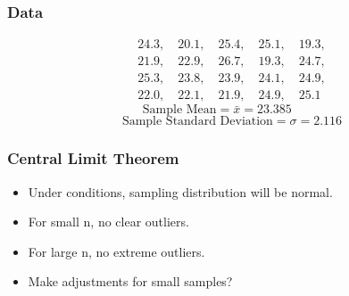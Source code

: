 \documentclass{beamer}
\begin{document}
\begin{frame}
  \frametitle{Data}
  \begin{displaymath}
    \begin{array}{l}
      24.3, \quad 
      20.1, \quad 
      25.4, \quad 
      25.1, \quad 
      19.3, \\[1em]
      21.9, \quad 
      22.9, \quad 
      26.7, \quad 
      19.3, \quad 
      24.7, \\[1em]
      25.3, \quad 
      23.8, \quad 
      23.9, \quad 
      24.1, \quad 
      24.9, \\[1em]
      22.0, \quad
      22.1, \quad 
      21.9, \quad 
      24.9, \quad 
      25.1 
    \end{array}
  \end{displaymath} 
  \vspace{0.3cm}
  \begin{equation*}
    \text{Sample Mean} = \bar{x} = 23.385 \hspace{1cm} 
  \end{equation*}
  \vspace{0.3cm}
  \begin{equation*}
    \text{Sample Standard Deviation} = \sigma = 2.116
  \end{equation*}
\end{frame}

\begin{frame}
  \frametitle{Central Limit Theorem}
  \begin{itemize}
    \item[] 
      Under conditions, sampling distribution will be normal.
      \vspace{0.5cm}
    \item[] 
      For small n, no clear outliers. 
      \vspace{0.5cm}
    \item[] 
      For large n, no extreme outliers.
      \vspace{0.5cm}
    \item[] 
      Make adjustments for small samples?
  \end{itemize}
\end{frame}
\end{document}
